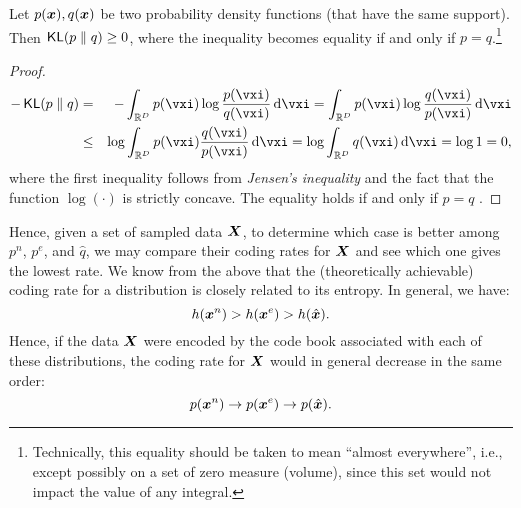 \documentclass[../../book-main.tex]{subfiles}
\begin{document}
\begin{theorem}\label{thm:information-inequality}
	Let $p(\bm{x}), q(\bm{x})$ be two probability density functions (that have the same
	support). Then $\operatorname{\mathsf{KL}}(p\;\|\; q) \ge 0$, where the inequality becomes equality if and only if $p = q$.\footnote{Technically, this equality should be taken to mean ``almost everywhere'', i.e., except possibly on a set of zero measure (volume), since this set would not impact the value of any integral.}
\end{theorem}
\begin{proof}
	\begin{eqnarray*}
		- \KL(p\mmid q)
		&=& - \int_{\R^{D}} p(\vxi) \log \frac{p(\vxi)}{q(\vxi)} \odif{\vxi}
		=  \int_{\R^{D}} p(\vxi) \log \frac{q(\vxi)}{p(\vxi)} \odif{\vxi} \\
		&\le& \log \int_{\R^{D}} p(\vxi)  \frac{q(\vxi)}{p(\vxi)} \odif{\vxi} \label{eqn:jensen-KL}
		= \log \int_{\R^{D}} q(\vxi) \odif{\vxi} = \log 1 = 0,
	\end{eqnarray*}
	where the first inequality follows from {\em Jensen's inequality} and the
	fact that the function $\log(\cdot)$ is strictly concave. The equality holds
	if and only if $p = q$ .
\end{proof}

Hence, given a set of sampled data $\bm{X}$, to determine which case is better among $p^{n}$, $p^{e}$,  and $\hat{q}$, we may compare their coding rates for $\bm{X}$ and see which one gives the lowest rate. We know from the above that the (theoretically achievable) coding rate for a distribution is closely related to its entropy. In general, we have:
\begin{equation}
	h(\bm{x}^n) > h(\bm{x}^e) > h(\hat {\bm{x}}).
\end{equation}
Hence, if the data $\bm{X}$ were encoded by the code book associated with each of these distributions, the coding rate for $\bm{X}$ would in general decrease in the same order:
\begin{equation}
	p(\bm{x}^n) \rightarrow p(\bm{x}^e) \rightarrow p(\hat {\bm{x}}).
\end{equation}
\end{document}
